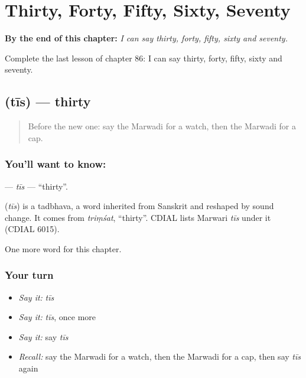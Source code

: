 
\chapter{Thirty, Forty, Fifty, Sixty, Seventy}
\label{ch:mw-thirty-forty-fifty-sixty-seventy}

\begin{chapteropening}
\textbf{By the end of this chapter:} \emph{I can say thirty, forty, fifty, sixty and seventy.}

Complete the last lesson of chapter 86: I can say thirty, forty, fifty, sixty and seventy.
\end{chapteropening}

\section[\texorpdfstring{\mw{तीस} (tīs)}{तीस (tīs)}]{ (tīs) — thirty}

\label{lesson:MW-C86-tis}



\begin{quote}
Before the new one: say the Marwadi for a watch, then the Marwadi for a cap.
\end{quote}

\subsection*{You'll want to know: }
\textbf{} — \emph{tīs} — \textquotedblleft{}thirty\textquotedblright{}.

\begin{cousinweb}
\textbf{} (\emph{tīs}) is a tadbhava, a word inherited from Sanskrit and reshaped by sound change. It comes from \emph{triṃśat}, \textquotedblleft{}thirty\textquotedblright{}. CDIAL lists Marwari \emph{tīs} under it (CDIAL 6015).
\end{cousinweb}

\begin{grammarlens}[title={What you've built}]
One more word for this chapter.
\end{grammarlens}

\subsection*{Your turn}
\begin{itemize}
\raggedright
  \item \emph{Say it:} \emph{tīs}
  \item \emph{Say it:} \emph{tīs}, once more
  \item \emph{Say it:} say \emph{tīs}
  \item \emph{Recall:} say the Marwadi for a watch, then the Marwadi for a cap, then say \emph{tīs} again
\end{itemize}

